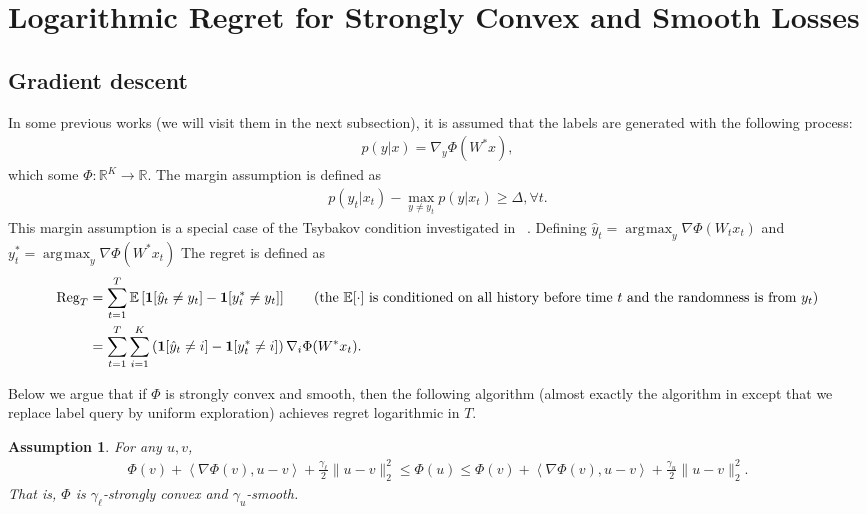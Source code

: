 \documentclass{article}
\newcommand{\Reg}{\text{\rm Reg}}
\newcommand{\one}{\boldsymbol{1}}
\newcommand{\nb}{\nabla}
\newcommand{\field}[1]{\mathbb{#1}}
\newcommand{\E}{\field{E}}
\newcommand{\inner}[1]{ \left\langle {#1} \right\rangle }
\newtheorem{assumption}{Assumption}
\DeclareMathOperator*{\argmax}{\arg\!\max}
\begin{document}
\section{Logarithmic Regret for Strongly Convex and Smooth Losses}
\subsection{Gradient descent}
In some previous works (we will visit them in the next subsection), it is assumed that the labels are generated with the following process: 
\begin{align}
    p(y|x) = \nabla_y\Phi(W^*x), 
\end{align}
which some $\Phi: \mathbb{R}^K \rightarrow \mathbb{R}$.
The margin assumption is defined as 
\begin{align}
    p(y_t|x_t) - \max_{y\neq y_t}p(y|x_t) \geq \Delta, \forall t.  \label{eqn:new margin}
\end{align}
This margin assumption is a special case of the Tsybakov condition investigated in ~\cite{agarwal2013selective}. 
Defining $\hat{y}_t = \argmax_y \nabla\Phi(W_tx_t)$ and $y^*_t = \argmax_y \nabla\Phi(W^*x_t) $ The regret is defined as
\begin{align}
    \Reg_T &= \sum_{t=1}^T \E\left[ \one[\hat{y}_t\neq y_t] - \one[y_t^*\neq y_t]\right] \tag{the $\E[\cdot]$ is conditioned on all history before time $t$ and the randomness is from $y_t$} \\
    &= \sum_{t=1}^T \sum_{i=1}^K \left(\one[\hat{y}_t\neq i] - \one[y^*_t\neq i]\right)\nabla_i\Phi(W^*x_t). \label{eqn:new regret}
\end{align}

Below we argue that if $\Phi$ is strongly convex and smooth, then the following algorithm (almost exactly the algorithm in \cite{agarwal2013selective} except that we replace label query by uniform exploration) achieves regret logarithmic in $T$. 

\begin{assumption}
For any $u,v$, 
\begin{align*}
     \Phi(v) + \inner{\nb\Phi(v),u-v} + \frac{\gamma_\ell}{2}\|u-v\|_2^2 \leq \Phi(u)\leq \Phi(v) + \inner{\nb\Phi(v),u-v} + \frac{\gamma_u}{2}\|u-v\|_2^2. 
\end{align*}
That is, $\Phi$ is $\gamma_\ell$-strongly convex and $\gamma_u$-smooth. 
\end{assumption}
\end{document}
